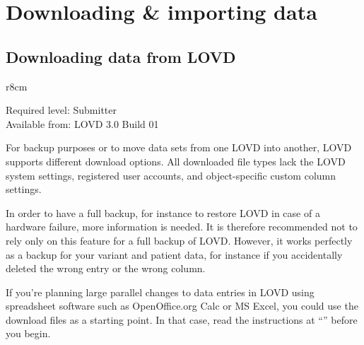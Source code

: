 




\hypertarget{sec:download_import_data}{}
\section{Downloading \& importing data}
\hypertarget{ssec:download_data}{}
\subsection{Downloading data from LOVD}
\begin{wrapfigure}[3]{r}{8cm} %
  \vspace{-25pt}
  \begin{leftbar}
    Required level: Submitter\\
    Available from: LOVD 3.0 Build 01
  \end{leftbar}
\end{wrapfigure}
For backup purposes or to move data sets from one LOVD into another, LOVD supports different download options.
All downloaded file types lack the LOVD system settings, registered user accounts, and object-specific custom
 column settings.

In order to have a full backup, for instance to restore LOVD in case of a hardware failure, more information
 is needed.
It is therefore recommended not to rely only on this feature for a full backup of LOVD.
However, it works perfectly as a backup for your variant and patient data, for instance if you accidentally
 deleted the wrong entry or the wrong column.

If you're planning large parallel changes to data entries in LOVD using spreadsheet software such as
 OpenOffice.org Calc or MS Excel, you could use the download files as a starting point.
In that case, read the instructions at ``'' before you begin.

\begin{comment}
In case you provided search terms, only the results will be included in the download file.
Also the order in the downloaded file is equal to the order of the entries on the screen.
\end{comment}



\hypertarget{ssec:importing_data}{}
